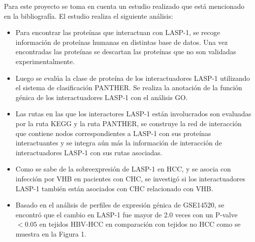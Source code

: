 \documentclass[twocolumn,twoside,12pt]{article}
\begin{document}
Para este proyecto se toma en cuenta un estudio realizado que est\'a mencionado en la bibliograf\'ia. El estudio realiza el siguiente an\'alisis:
\begin{itemize}
\item Para encontrar las prote\'inas que interactuan con LASP-1, se recoge informaci\'on de prote\'inas humanas en distintas base de datos. Una vez encontradas las prote\'inas se descartan las prote\'inas que no son validadas experimentalmente.
\item Luego se eval\'ua la clase de proteína de los interactuadores LASP-1 utilizando el sistema de clasificación PANTHER.
Se realiza la anotaci\'on de la funci\'on g\'enica de los interactuadores LASP-1 con el an\'alisis GO.
\item Las rutas en las que los interactores LASP-1 est\'an involucrados son evaluadas por la ruta KEGG y la ruta PANTHER, se construye la red de interacci\'on que contiene nodos correspondientes a LASP-1 con sus prote\'inas interactuantes y se integra a\'un m\'as la informaci\'on de interacci\'on de interactuadores LASP-1 con sus rutas asociadas.
\item Como se sabe de la sobreexpresi\'on de LASP-1 en HCC, y se asocia con infección por VHB en pacientes con CHC, se investig\'o si los interactuadores LASP-1 también están asociados con CHC relacionado con VHB.
\item Basado en el an\'alisis de perfiles de expresi\'on g\'enica de GSE14520, se encontr\'o que el cambio en LASP-1 fue mayor de 2.0 veces con un P-valve $<0.05$ en tejidos HBV-HCC en comparación con tejidos no HCC como se muestra en la Figura 1. 



\end{itemize}
\end{document}
